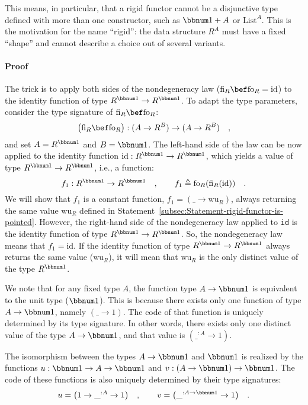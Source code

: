 This means, in particular, that a rigid functor cannot be a disjunctive
type defined with more than one constructor, such as $\bbnum 1+A$
or $\text{List}^{A}$. This is the motivation for the name \textsf{``}rigid\textsf{''}:
the data structure $R^{A}$ must have a fixed \textsf{``}shape\textsf{''} and cannot
describe a choice out of several variants. 

\paragraph{Proof}

The trick is to apply both sides of the nondegeneracy law ($\text{fi}_{R}\bef\text{fo}_{R}=\text{id}$)
to the identity function of type $R^{\bbnum 1}\rightarrow R^{\bbnum 1}$.
To adapt the type parameters, consider the type signature of $\text{fi}_{R}\bef\text{fo}_{R}$:
\[
\big(\text{fi}_{R}\bef\text{fo}_{R}\big):(A\rightarrow R^{B})\rightarrow(A\rightarrow R^{B})\quad,
\]
and set $A=R^{\bbnum 1}$ and $B=\bbnum 1$. The left-hand side of
the law can be now applied to the identity function $\text{id}:R^{\bbnum 1}\rightarrow R^{\bbnum 1}$,
which yields a value of type $R^{\bbnum 1}\rightarrow R^{\bbnum 1}$,
i.e., a function:
\[
f_{1}:R^{\bbnum 1}\rightarrow R^{\bbnum 1}\quad,\quad\quad f_{1}\triangleq\text{fo}_{R}(\text{fi}_{R}(\text{id}))\quad.
\]
We will show that $f_{1}$ is a constant function, $f_{1}=(\_\rightarrow\text{wu}_{R})$,
always returning the same value $\text{wu}_{R}$ defined in Statement~\ref{subsec:Statement-rigid-functor-is-pointed}.
However, the right-hand side of the nondegeneracy law applied to \lstinline!id!
is the identity function of type $R^{\bbnum 1}\rightarrow R^{\bbnum 1}$.
So, the nondegeneracy law means that $f_{1}=\text{id}$. If the identity
function of type $R^{\bbnum 1}\rightarrow R^{\bbnum 1}$ always returns
the same value ($\text{wu}_{R}$), it will mean that $\text{wu}_{R}$
is the only distinct value of the type $R^{\bbnum 1}$.

We note that for any fixed type $A$, the function type $A\rightarrow\bbnum 1$
is equivalent to the unit type ($\bbnum 1$). This is because there
exists only one function of type $A\rightarrow\bbnum 1$, namely $(\_\rightarrow1)$.
The code of that function is uniquely determined by its type signature.
In other words, there exists only one distinct value of the type $A\rightarrow\bbnum 1$,
and that value is $(\_^{:A}\rightarrow1)$. 

The isomorphism between the types $A\rightarrow\bbnum 1$ and $\bbnum 1$
is realized by the functions $u:\bbnum 1\rightarrow A\rightarrow\bbnum 1$
and $v:\left(A\rightarrow\bbnum 1\right)\rightarrow\bbnum 1$. The
code of these functions is also uniquely determined by their type
signatures:
\[
u=\big(1\rightarrow\_^{:A}\rightarrow1\big)\quad,\quad\quad v=\big(\_^{:A\rightarrow\bbnum 1}\rightarrow1\big)\quad.
\]

